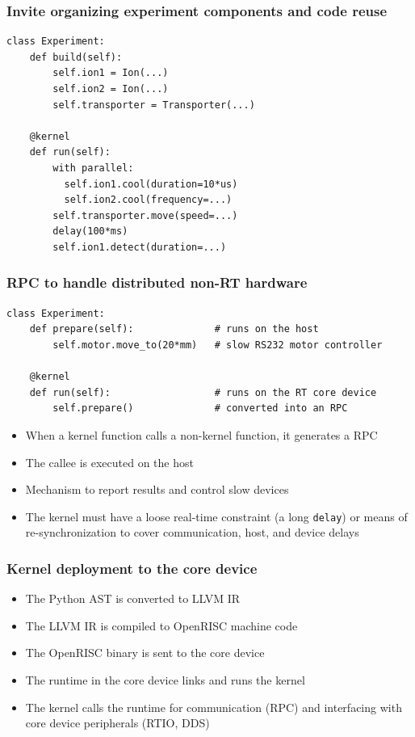 \documentclass[final,presentation,compress]{beamer}
\begin{document}
\begin{frame}[fragile]
  \frametitle{Invite organizing experiment components and code reuse}
  \footnotesize

  \begin{verbatim}
class Experiment:
    def build(self):
        self.ion1 = Ion(...)
        self.ion2 = Ion(...)
        self.transporter = Transporter(...)

    @kernel
    def run(self):
        with parallel:
          self.ion1.cool(duration=10*us)
          self.ion2.cool(frequency=...)
        self.transporter.move(speed=...)
        delay(100*ms)
        self.ion1.detect(duration=...)
  \end{verbatim}
\end{frame}


\begin{frame}[fragile]
  \frametitle{RPC to handle distributed non-RT hardware}
  \footnotesize

  \begin{verbatim}
class Experiment:
    def prepare(self):              # runs on the host
        self.motor.move_to(20*mm)   # slow RS232 motor controller

    @kernel
    def run(self):                  # runs on the RT core device
        self.prepare()              # converted into an RPC
  \end{verbatim}

  \begin{itemize}
    \item When a kernel function calls a non-kernel function, it generates a RPC
    \item The callee is executed on the host
    \item Mechanism to report results and control slow devices
    \item The kernel must have a loose real-time constraint (a long \verb!delay!)
        or means of re-synchronization to cover communication, host, and device delays
  \end{itemize}
\end{frame}


\begin{frame}
  \frametitle{Kernel deployment to the core device}
  \footnotesize
  \begin{itemize}
    \item The Python AST is converted to LLVM IR
    \item The LLVM IR is compiled to OpenRISC machine code
    \item The OpenRISC binary is sent to the core device
    \item The runtime in the core device links and runs the kernel
    \item The kernel calls the runtime for communication (RPC) and interfacing
      with core device peripherals (RTIO, DDS)
  \end{itemize}
\end{frame}
\end{document}
